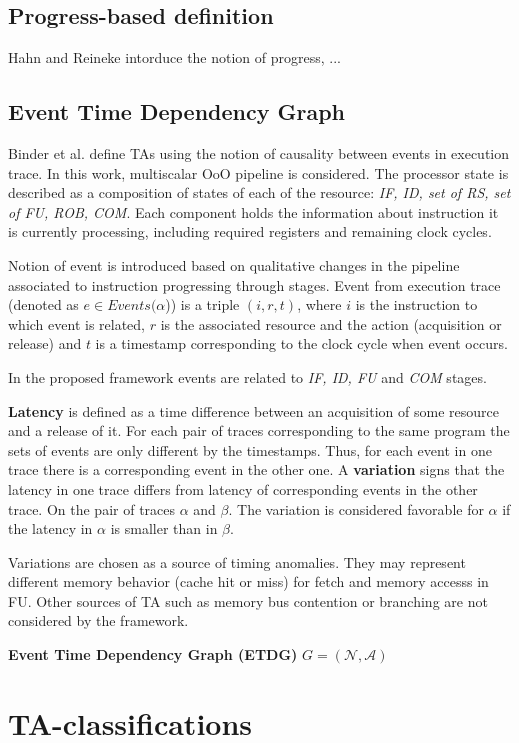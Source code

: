 \subsection{Progress-based definition}

Hahn and Reineke \cite{hahn_design_2020} intorduce the notion of progress, ... \cite{gruin_minotaur_2023}

\subsection{Event Time Dependency Graph}

Binder et al. \cite{binder_definitions_2022} define TAs using the notion of causality between events in execution trace. In this work, multiscalar OoO pipeline is considered. The processor state is described as a composition of states of each of the resource: \textit{IF, ID, set of RS, set of FU, ROB, COM}. Each component holds the information about instruction it is currently processing, including required registers and remaining clock cycles.

Notion of event is introduced based on qualitative changes in the pipeline associated to instruction progressing through stages. Event from execution trace (denoted as $e \in Events(\alpha$)) is a triple $(i,r,t)$, where $i$ is the instruction to which event is related, $r$ is the associated resource and the action (acquisition or release) and $t$ is a timestamp corresponding to the clock cycle when event occurs.

In the proposed framework events are related to \textit{IF, ID, FU} and \textit{COM} stages.

\textbf{Latency} is defined as a time difference between an acquisition of some resource and a release of it. For each pair of traces corresponding to the same program the sets of events are only different by the timestamps. Thus, for each event in one trace there is a corresponding event in the other one. A \textbf{variation} signs that the latency in one trace differs from latency of corresponding events in the other trace. On the pair of traces $\alpha$ and $\beta$. The variation is considered favorable for $\alpha$ if the latency in $\alpha$ is smaller than in $\beta$.

Variations are chosen as a source of timing anomalies. They may represent different memory behavior (cache hit or miss) for fetch and memory accesss in FU. Other sources of TA such as memory bus contention or branching are not considered by the framework.

\textbf{Event Time Dependency Graph (ETDG)} $G = (\mathcal{N}, \mathcal{A})$ \TODO{}


\section{TA-classifications}

